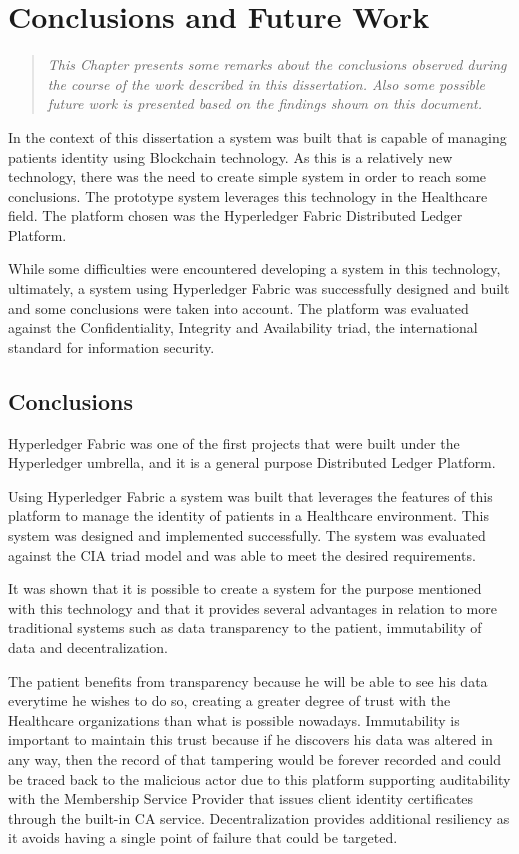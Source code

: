 \chapter{Conclusions and Future Work}
\label{Conclusion}

\begin{quote}
\emph{This Chapter presents some remarks about the conclusions observed during
the course of the work described in this dissertation. Also some possible
future work is presented based on the findings shown on this document.}
\end{quote}

In the context of this dissertation a system was built that is capable of
managing patients identity using Blockchain technology. As this is a relatively
new technology, there was the need to create simple system in order to reach
some conclusions. The prototype system leverages this technology in the
Healthcare field. The platform chosen was the Hyperledger Fabric Distributed
Ledger Platform. 

While some difficulties were encountered developing a system in this
technology, ultimately, a system using Hyperledger Fabric was successfully
designed and built and some conclusions were taken into account. The platform
was evaluated against the Confidentiality, Integrity and Availability triad,
the international standard for information security.

\section{Conclusions}

Hyperledger Fabric was one of the first projects that were built under the
Hyperledger umbrella, and it is a general purpose Distributed Ledger Platform.

Using Hyperledger Fabric a system was built that leverages the features of this
platform to manage the identity of patients in a Healthcare environment. This
system was designed and implemented successfully. The system was evaluated
against the CIA triad model and was able to meet the desired requirements.

It was shown that it is possible to create a system for the purpose mentioned
with this technology and that it provides several advantages in relation to
more traditional systems such as data transparency to the patient, immutability
of data and decentralization.

The patient benefits from transparency because he will be able to see his data
everytime he wishes to do so, creating a greater degree of trust with the
Healthcare organizations than what is possible nowadays. Immutability is
important to maintain this trust because if he discovers his data was altered
in any way, then the record of that tampering would be forever recorded and
could be traced back to the malicious actor due to this platform supporting
auditability with the Membership Service Provider that issues client identity
certificates through the built-in CA service.  Decentralization provides
additional resiliency as it avoids having a single point of failure that could
be targeted.

